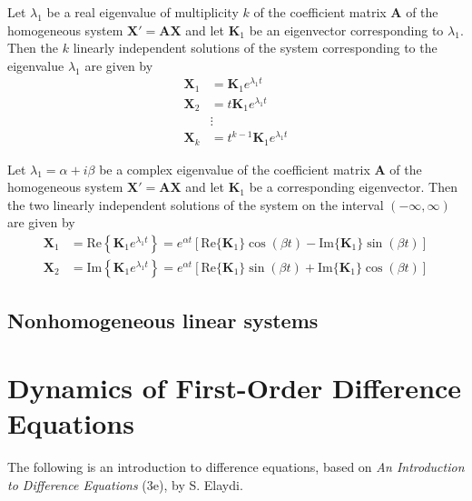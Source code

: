 \documentclass{article}
\begin{document}
\begin{thm} 
    Let \(\lambda_1\) be a real eigenvalue of multiplicity \(k\) of the coefficient matrix \(\mathbf{A}\) of the homogeneous system \(\mathbf{X'} = \mathbf{AX}\) and let \(\mathbf{K}_1\) be an eigenvector corresponding to \(\lambda_1\). Then the \(k\) linearly independent solutions of the system corresponding to the eigenvalue \(\lambda_1\) are given by
    \begin{align}
        \mathbf{X}_1 &= \mathbf{K}_1 e^{\lambda_1 t}\\
        \mathbf{X}_2 &= t\mathbf{K}_1 e^{\lambda_1 t}\\
        &\vdots\\
        \mathbf{X}_k &= t^{k-1} \mathbf{K}_1 e^{\lambda_1 t}
    \end{align}
\end{thm}

\begin{thm} 
    Let \(\lambda_1 = \alpha + i\beta\) be a complex eigenvalue of the coefficient matrix \(\mathbf{A}\) of the homogeneous system \(\mathbf{X'} = \mathbf{AX}\) and let \(\mathbf{K}_1\) be a corresponding eigenvector. Then the two linearly independent solutions of the system on the interval \((-\infty, \infty)\) are given by
    \begin{align}
        \mathbf{X}_1 &= \text{Re} \left\{\mathbf{K}_1 e^{\lambda_1 t}\right\} = e^{\alpha t} \left[\text{Re} \{\mathbf{K}_1\} \cos(\beta t) - \text{Im} \{\mathbf{K}_1\} \sin(\beta t)\right]\\
        \mathbf{X}_2 &= \text{Im} \left\{\mathbf{K}_1 e^{\lambda_1 t}\right\} = e^{\alpha t} \left[\text{Re} \{\mathbf{K}_1\} \sin(\beta t) + \text{Im} \{\mathbf{K}_1\} \cos(\beta t)\right]
    \end{align}
\end{thm}

\subsection{Nonhomogeneous linear systems}

\section{Dynamics of First-Order Difference Equations}

The following is an introduction to difference equations, based on \emph{An Introduction to Difference Equations} (3e), by S. Elaydi.
\end{document}
